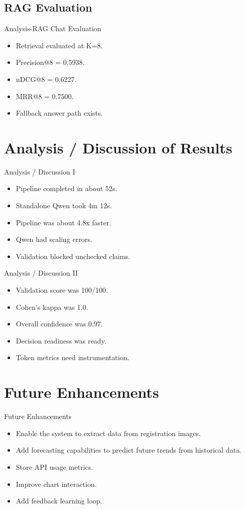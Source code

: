 \documentclass[10pt,aspectratio=43]{beamer}
\begin{document}
\subsection{RAG Evaluation}
\begin{frame}{Analysis-RAG Chat Evaluation}
\begin{itemize}
  \item Retrieval evaluated at K=8.
  \item Precision@8 = 0.5938.
  \item nDCG@8 = 0.6227.
  \item MRR@8 = 0.7500.
  \item Fallback answer path exists.
\end{itemize}
\end{frame}

\section{Analysis / Discussion of Results}
\begin{frame}{Analysis / Discussion I}
\begin{itemize}
  \item Pipeline completed in about 52s.
  \item Standalone Qwen took 4m 12s.
  \item Pipeline was about 4.8x faster.
  \item Qwen had scaling errors.
  \item Validation blocked unchecked claims.
\end{itemize}
\end{frame}

\begin{frame}{Analysis / Discussion II}
\begin{itemize}
  \item Validation score was 100/100.
  \item Cohen's kappa was 1.0.
  \item Overall confidence was 0.97.
  \item Decision readiness was ready.
  \item Token metrics need instrumentation.
\end{itemize}
\end{frame}

\section{Future Enhancements}
\begin{frame}{Future Enhancements}
\begin{itemize}
  \item Enable the system to extract data from registration images.
  \item Add forecasting capabilities to predict future trends from historical data.
  \item Store API usage metrics.
  \item Improve chart interaction.
  \item Add feedback learning loop.
\end{itemize}
\end{frame}
\end{document}
